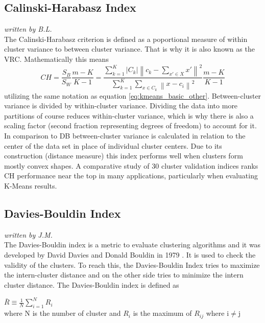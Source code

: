 \subsection{Calinski-Harabasz Index}
\textit{written by B.L.}\\

The Calinski-Harabasz criterion \cite{calinski1974dendrite} is defined as a poportional measure of within cluster variance to between cluster variance. That is why it is also known as the \gls{VRC}. Mathematically this means
\begin{equation}
        CH = \frac{S_{B}}{S_{W}}\frac{m-K}{K-1} = \frac{\sum_{k=1}^{K} \left | C_{k} \right | \left \| c_{k} - \sum_{x' \in X}^{} x' \right \|^{2}}{\sum_{k=1}^{K}\sum_{x \in C_{k}}^{} \left \| x - c_{i} \right \|^{2}} \frac{m-K}{K-1}
\end{equation}
utilizing the same notation as equation \ref{eq:kmeans_basic_other}. Between-cluster variance is divided by within-cluster variance. Dividing the data into more partitions of course reduces within-cluster variance, which is why there is also a scaling factor (second fraction representing degrees of freedom) to account for it. In comparison to \gls{DB} between-cluster variance is calculated in relation to the center of the data set in place of individual cluster centers. Due to its construction (distance measure) this index performs well when clusters form mostly convex shapes. A comparative study of 30 cluster validation indices \cite{arbelaitz2013extensive} ranks \gls{CH} performance near the top in many applications, particularly when evaluating K-Means results.
    
\subsection{Davies-Bouldin Index}
\textit{written by J.M.}\\

The Davies-Bouldin index is a metric to evaluate clustering algorithms and it was developed by David Davies and Donald Bouldin in 1979 \cite{davies1979cluster}. 
It is used to check the validity of the clusters. To reach this, the Davies-Bouldin Index tries to maximize the intern-cluster distance 
and on the other side tries to minimize the intern cluster distance. 
The Davies-Bouldin index is defined as 
	
$ \bar{R} \equiv \frac{1}{N} \sum_{i=1}^{N} R_i  $ \\
where N is the number of cluster and $R_i$ is the maximum of $R_{ij}$ where i$\neq$j \\
	
